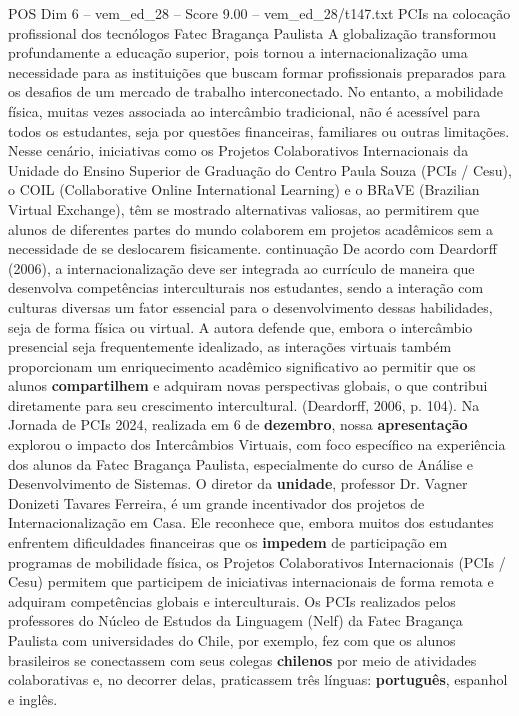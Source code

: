 \begin{textsample}{POS Dim 6 – vem\_ed\_28 – Score 9.00 – vem\_ed\_28/t147.txt}  \label{ex:f6_pos_023}
PCIs na colocação profissional dos tecnólogos Fatec Bragança Paulista A globalização transformou profundamente a educação superior, pois tornou a internacionalização uma necessidade para as instituições que buscam formar profissionais preparados para os desafios de um mercado de trabalho interconectado.
No entanto, a mobilidade física, muitas vezes associada ao intercâmbio tradicional, não é acessível para todos os estudantes, seja por questões financeiras, familiares ou outras limitações.
Nesse cenário, iniciativas como os Projetos Colaborativos Internacionais da Unidade do Ensino Superior de Graduação do Centro Paula Souza (PCIs / Cesu), o COIL (Collaborative Online International Learning) e o BRaVE (Brazilian Virtual Exchange), têm se mostrado alternativas valiosas, ao permitirem que alunos de diferentes partes do mundo colaborem em projetos acadêmicos sem a necessidade de se deslocarem fisicamente. continuação De acordo com Deardorff (2006), a internacionalização deve ser integrada ao currículo de maneira que desenvolva competências interculturais nos estudantes, sendo a interação com culturas diversas um fator essencial para o desenvolvimento dessas habilidades, seja de forma física ou virtual.
A autora defende que, embora o intercâmbio presencial seja frequentemente idealizado, as interações virtuais também proporcionam um enriquecimento acadêmico significativo ao permitir que os alunos \textbf{compartilhem} e adquiram novas perspectivas globais, o que contribui diretamente para seu crescimento intercultural. (Deardorff, 2006, p. 104).
Na Jornada de PCIs 2024, realizada em 6 de \textbf{dezembro}, nossa \textbf{apresentação} explorou o impacto dos Intercâmbios Virtuais, com foco específico na experiência dos alunos da Fatec Bragança Paulista, especialmente do curso de Análise e Desenvolvimento de Sistemas.
O diretor da \textbf{unidade}, professor Dr.
Vagner Donizeti Tavares Ferreira, é um grande incentivador dos projetos de Internacionalização em Casa.
Ele reconhece que, embora muitos dos estudantes enfrentem dificuldades financeiras que os \textbf{impedem} de participação em programas de mobilidade física, os Projetos Colaborativos Internacionais (PCIs / Cesu) permitem que participem de iniciativas internacionais de forma remota e adquiram competências globais e interculturais.
Os PCIs realizados pelos professores do Núcleo de Estudos da Linguagem (Nelf) da Fatec Bragança Paulista com universidades do Chile, por exemplo, fez com que os alunos brasileiros se conectassem com seus colegas \textbf{chilenos} por meio de atividades colaborativas e, no decorrer delas, praticassem três línguas: \textbf{português}, espanhol e inglês.

\end{textsample}
